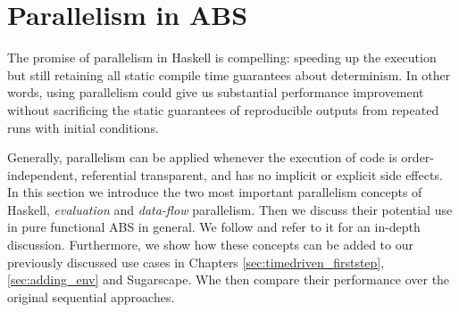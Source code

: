 \chapter{Parallelism in ABS}
\label{ch:parallelism_ABS}
The promise of parallelism in Haskell is compelling: speeding up the execution but still retaining all static compile time guarantees about determinism. In other words, using parallelism could give us substantial performance improvement without sacrificing the static guarantees of reproducible outputs from repeated runs with initial conditions.

Generally, parallelism can be applied whenever the execution of code is order-independent, referential transparent, and has no implicit or explicit side effects. In this section we introduce the two most important parallelism concepts of Haskell, \textit{evaluation} and \textit{data-flow} parallelism. Then we discuss their potential use in pure functional ABS in general. We follow \cite{marlow_parallel_2013} and refer to it for an in-depth discussion. Furthermore, we show how these concepts can be added to our previously discussed use cases in Chapters \ref{sec:timedriven_firststep}, \ref{sec:adding_env} and Sugarscape. Whe then compare their performance over the original sequential approaches.





%
%




